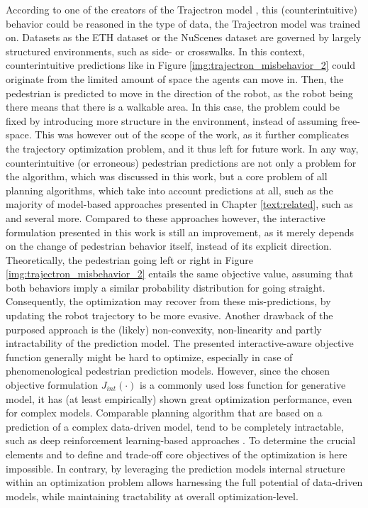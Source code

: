 According to one of the creators of the Trajectron model \cite{Salzmann2020}, this (counterintuitive) behavior could be reasoned in the type of data, the Trajectron model was trained on. Datasets as the ETH dataset \cite{Pellegrini2009} or the NuScenes dataset \cite{Caesar2020} are governed by largely structured environments, such as side- or crosswalks. In this context, counterintuitive predictions like in Figure \ref{img:trajectron_misbehavior_2} could originate from the limited amount of space the agents can move in. Then, the pedestrian is predicted to move in the direction of the robot, as the robot being there means that there is a walkable area. In this case, the problem could be fixed by introducing more structure in the environment, instead of assuming free-space. This was however out of the scope of the work, as it further complicates the trajectory optimization problem, and it thus left for future work. In any way, counterintuitive (or erroneous) pedestrian predictions are not only a problem for the algorithm, which was discussed in this work, but a core problem of all planning algorithms, which take into account predictions at all, such as the majority of model-based approaches presented in Chapter \ref{text:related}, such as \cite{Fox1997}\cite{Phillips2011}\cite{Knepper2012}\cite{Luo2018a}\cite{Nishimura2020a} and several more. Compared to these approaches however, the interactive formulation presented in this work is still an improvement, as it merely depends on the change of pedestrian behavior itself, instead of its explicit direction. Theoretically, the pedestrian going left or right in Figure \ref{img:trajectron_misbehavior_2} entails the same objective value, assuming that both behaviors imply a similar probability distribution for going straight. Consequently, the optimization may recover from these mis-predictions, by updating the robot trajectory to be more evasive.
\newline
Another drawback of the purposed approach is the (likely) non-convexity, non-linearity and partly intractability of the prediction model. The presented interactive-aware objective function generally might be hard to optimize, especially in case of phenomenological pedestrian prediction models. However, since the chosen objective formulation $J_{int}(\cdot)$ is a commonly used loss function for generative model, it has (at least empirically) shown great optimization performance, even for complex models. Comparable planning algorithm that are based on a prediction of a complex data-driven model, tend to be completely intractable, such as deep reinforcement learning-based approaches \cite{Knepper2012}\cite{Chen2017}\cite{Everett2018}. To determine the crucial elements and to define and trade-off core objectives of the optimization is here impossible. In contrary, by leveraging the prediction models internal structure within an optimization problem allows harnessing the full potential of data-driven models, while maintaining tractability at overall optimization-level.